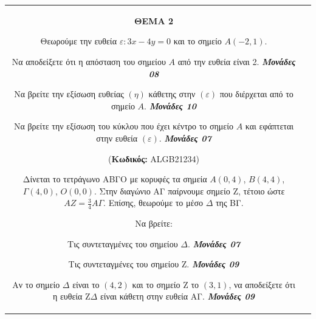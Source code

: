 \documentclass[11pt,a4paper,twoside]{book}
\newcounter{askhsh}[chapter]
\renewcommand{\theaskhsh}{
	\bf{\titlefont{\Large{\thechapter}}.\arabic{askhsh}}
}
\newcommand{\Askhsh}[2]{\refstepcounter{askhsh}{\vspace{4mm}\titlefont{{\large Άσκηση}\theaskhsh} - \textcolor{maincolor}{ΘEMA #2}} ({\small{\textbf{Κωδικός:} #1}})}{}
\newcommand{\monades}[1]{
\hspace*{\fill}
\textbf{\textit{\textcolor{maincolor}{Μονάδες #1}}}}
\begin{document}
\begin{tabular}{cc}
\vspace{4mm}

\textbf{ΘΕΜΑ 2}

Θεωρούμε την ευθεία $\varepsilon: 3x - 4y = 0$ και το σημείο $A(-2,1)$.

\begin{alist}    \item Να αποδείξετε ότι η απόσταση του σημείου $A$ από την ευθεία είναι 2. \monades{08}
    \item Να βρείτε την εξίσωση ευθείας $(\eta)$ κάθετης στην $(\varepsilon)$ που διέρχεται από το σημείο $A$. \monades{10}
    \item Να βρείτε την εξίσωση του κύκλου που έχει κέντρο το σημείο $A$ και εφάπτεται στην ευθεία $(\varepsilon)$. \monades{07}\end{alist}

\vspace{4mm}

\Askhsh{ALGB21234}{2} %

Δίνεται το τετράγωνο ΑΒΓΟ με κορυφές τα σημεία $A(0,4)$, $B(4,4)$, $\Gamma(4,0)$, $O(0,0)$. Στην διαγώνιο ΑΓ παίρνουμε σημείο Ζ, τέτοιο ώστε $AZ = \frac{3}{4} A\Gamma$. Επίσης, θεωρούμε το μέσο $\Delta$ της ΒΓ.

\begin{alist}    \item Να βρείτε:
    \begin{rlist}
        \item Τις συντεταγμένες του σημείου $\Delta$. \monades{07}
        \item Τις συντεταγμένες του σημείου Ζ. \monades{09}
    \end{rlist}
    \item Αν το σημείο $\Delta$ είναι το $(4,2)$ και το σημείο Ζ το $(3,1)$, να αποδείξετε ότι η ευθεία Ζ$\Delta$ είναι κάθετη στην ευθεία ΑΓ. \monades{09}\end{alist}


\end{tabular}
\end{document}
